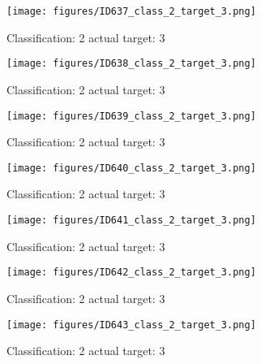 \begin{figure}[h!]
\begin{center}
\texttt{[image: figures/ID637\_class\_2\_target\_3.png]}
\end{center}
\caption{ Classification: 2 actual target: 3}
\label{fig:ID637_class_2_target_3}
\end{figure}
\begin{figure}[h!]
\begin{center}
\texttt{[image: figures/ID638\_class\_2\_target\_3.png]}
\end{center}
\caption{ Classification: 2 actual target: 3}
\label{fig:ID638_class_2_target_3}
\end{figure}
\begin{figure}[h!]
\begin{center}
\texttt{[image: figures/ID639\_class\_2\_target\_3.png]}
\end{center}
\caption{ Classification: 2 actual target: 3}
\label{fig:ID639_class_2_target_3}
\end{figure}
\begin{figure}[h!]
\begin{center}
\texttt{[image: figures/ID640\_class\_2\_target\_3.png]}
\end{center}
\caption{ Classification: 2 actual target: 3}
\label{fig:ID640_class_2_target_3}
\end{figure}
\begin{figure}[h!]
\begin{center}
\texttt{[image: figures/ID641\_class\_2\_target\_3.png]}
\end{center}
\caption{ Classification: 2 actual target: 3}
\label{fig:ID641_class_2_target_3}
\end{figure}
\begin{figure}[h!]
\begin{center}
\texttt{[image: figures/ID642\_class\_2\_target\_3.png]}
\end{center}
\caption{ Classification: 2 actual target: 3}
\label{fig:ID642_class_2_target_3}
\end{figure}
\begin{figure}[h!]
\begin{center}
\texttt{[image: figures/ID643\_class\_2\_target\_3.png]}
\end{center}
\caption{ Classification: 2 actual target: 3}
\label{fig:ID643_class_2_target_3}
\end{figure}
